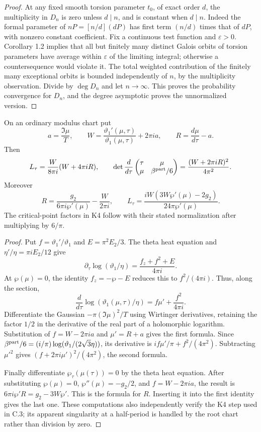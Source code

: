 \begin{proof}
At any fixed smooth torsion parameter $t_0$, of exact order
$d$, the multiplicity in $D_n$ is zero unless $d\mid n$,
and is constant when $d\mid n$. Indeed the formal parameter
of $nP=[n/d](dP)$ has first term $(n/d)$ times that of $dP$,
with nonzero constant coefficient. Fix a continuous test
function and $\varepsilon>0$. Corollary 1.2 implies that
all but finitely many distinct Galois orbits of torsion
parameters have average within $\varepsilon$ of the limiting
integral; otherwise a countersequence would violate it.
The total weighted contribution of the finitely many
exceptional orbits is bounded independently of $n$, by
the multiplicity observation. Divide by $\deg D_n$ and
let $n\to\infty$. This proves the probability convergence
for $D_n$, and the degree asymptotic proves the unnormalized
version.
\end{proof}

\begin{proposition}\label{ari:C.8.11}
On an ordinary modulus chart put
\[
 a=\frac{\Im\mu}{T},\qquad
 W=\frac{\vartheta_1'(\mu,\tau)}{\vartheta_1(\mu,\tau)}
                         +2\pi ia,\qquad
 R=\frac{d\mu}{d\tau}-a.
\]
Then
\[
 L_\tau=\frac{W}{8\pi i}(W+4\pi iR),\qquad
 \det\frac{d}{d\tau}
 \begin{pmatrix}\tau&\mu\\\mu&\beta^{\rm part}/6\end{pmatrix}
       =\frac{(W+2\pi iR)^2}{4\pi^2}.
\]
Moreover
\[
 R=\frac{g_2}{6\pi i\wp'(\mu)}-\frac{W}{2\pi i},
 \qquad
 L_\tau=\frac{iW(3W\wp'(\mu)-2g_2)}
                         {24\pi\wp'(\mu)}.
\]
The critical-point factors in K4 follow with their stated
normalization after multiplying by $6/\pi$.
\end{proposition}
\begin{proof}
Put $f=\vartheta_1'/\vartheta_1$ and
$E=\pi^2E_2/3$. The theta heat equation and
$\eta'/\eta=\pi iE_2/12$ give
\[
 \partial_\tau\log(\vartheta_1/\eta)
       =\frac{f_z+f^2+E}{4\pi i}.
\]
At $\wp(\mu)=0$, the identity $f_z=-\wp-E$ reduces
this to $f^2/(4\pi i)$. Thus, along the section,
\[
 \frac{d}{d\tau}\log(\vartheta_1(\mu,\tau)/\eta)
       =f\mu'+\frac{f^2}{4\pi i}.
\]
Differentiate the Gaussian $-\pi(\Im\mu)^2/T$ using
Wirtinger derivatives, retaining the factor $1/2$ in
the derivative of the real part of a holomorphic logarithm.
Substitution of $f=W-2\pi ia$ and $\mu'=R+a$ gives the
first formula. Since
$\beta^{\rm part}/6=(i/\pi)\log(\vartheta_1/(2\sqrt3\eta))$,
its derivative is $if\mu'/\pi+f^2/(4\pi^2)$.
Subtracting $\mu'^2$ gives
$(f+2\pi i\mu')^2/(4\pi^2)$, the second formula.

Finally differentiate $\wp_\tau(\mu(\tau))=0$ by the theta
heat equation. After substituting $\wp(\mu)=0$,
$\wp''(\mu)=-g_2/2$, and $f=W-2\pi ia$, the result is
$6\pi i\wp'R=g_2-3W\wp'$. This is the formula for $R$.
Inserting it into the first identity gives the last one.
These computations also independently verify the K4 step
used in C.3; its apparent singularity at a half-period is
handled by the root chart rather than division by zero.
\end{proof}


